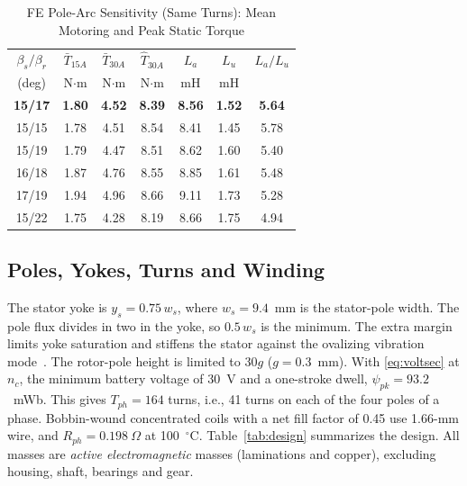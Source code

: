 \documentclass[journal]{IEEEtran}
\begin{document}
\begin{table}[!t]
\caption{FE Pole-Arc Sensitivity (Same Turns): Mean Motoring and Peak Static Torque}
\label{tab:arcs}
\centering
\renewcommand{\arraystretch}{1.08}
\setlength{\tabcolsep}{3.5pt}
\begin{tabular}{c c c c c c c}
\hline
$\beta_s/\beta_r$ & $\bar T_{15A}$ & $\bar T_{30A}$ & $\hat T_{30A}$ & $L_a$ & $L_u$ & $L_a/L_u$\\
(deg) & N$\cdot$m & N$\cdot$m & N$\cdot$m & mH & mH & \\
\hline
\textbf{15/17} & \textbf{1.80} & \textbf{4.52} & \textbf{8.39} & \textbf{8.56} & \textbf{1.52} & \textbf{5.64}\\
15/15 & 1.78 & 4.51 & 8.54 & 8.41 & 1.45 & 5.78\\
15/19 & 1.79 & 4.47 & 8.51 & 8.62 & 1.60 & 5.40\\
16/18 & 1.87 & 4.76 & 8.55 & 8.85 & 1.61 & 5.48\\
17/19 & 1.94 & 4.96 & 8.66 & 9.11 & 1.73 & 5.28\\
15/22 & 1.75 & 4.28 & 8.19 & 8.66 & 1.75 & 4.94\\
\hline
\end{tabular}
\end{table}

\subsection{Poles, Yokes, Turns and Winding}
The stator yoke is $y_s=0.75\,w_s$, where $w_s=9.4$~mm is the stator-pole width.
The pole flux divides in two in the yoke, so $0.5\,w_s$ is the minimum. The extra
margin limits yoke saturation and stiffens the stator against the ovalizing
vibration mode~\cite{miller1993}. The rotor-pole height is limited to $30g$
($g=0.3$~mm). With \eqref{eq:voltsec} at $n_c$, the minimum battery voltage of
30~V and a one-stroke dwell, $\psi_{pk}=93.2$~mWb. This gives $T_{ph}=164$
turns, i.e., 41 turns on each of the four poles of a phase. Bobbin-wound
concentrated coils with a net fill factor of 0.45 use 1.66-mm wire, and
$R_{ph}=0.198~\Omega$ at 100~$^\circ$C. Table~\ref{tab:design} summarizes the
design. All masses are \emph{active electromagnetic} masses (laminations and
copper), excluding housing, shaft, bearings and gear.
\end{document}
